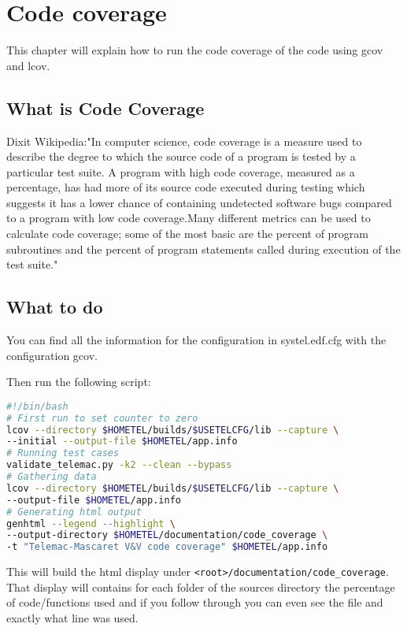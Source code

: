 %
\chapter{Code coverage}
%
This chapter will explain how to run the code coverage of the code using gcov and lcov.
%
%
\section{What is Code Coverage}
%
%
Dixit Wikipedia:"In computer science, code coverage is a measure used to
describe the degree to which the source code of a program is tested by a
particular test suite. A program with high code coverage, measured as a
percentage, has had more of its source code executed during testing which
suggests it has a lower chance of containing undetected software bugs compared
to a program with low code coverage.Many different metrics can be used to
calculate code coverage; some of the most basic are the percent of program
subroutines and the percent of program statements called during execution of
the test suite."
%
%
\section{What to do}
%
%
You can find all the information for the configuration in systel.edf.cfg with
the configuration gcov.

Then run the following script:
\begin{lstlisting}[language=bash]
#!/bin/bash
# First run to set counter to zero
lcov --directory $HOMETEL/builds/$USETELCFG/lib --capture \
--initial --output-file $HOMETEL/app.info
# Running test cases
validate_telemac.py -k2 --clean --bypass
# Gathering data
lcov --directory $HOMETEL/builds/$USETELCFG/lib --capture \
--output-file $HOMETEL/app.info
# Generating html output
genhtml --legend --highlight \
--output-directory $HOMETEL/documentation/code_coverage \
-t "Telemac-Mascaret V&V code coverage" $HOMETEL/app.info
\end{lstlisting}

This will build the html display under
\verb!<root>/documentation/code_coverage!. That display will contains for each
folder of the sources directory the percentage of code/functions used and if
you follow through you can even see the file and exactly what line was used.

